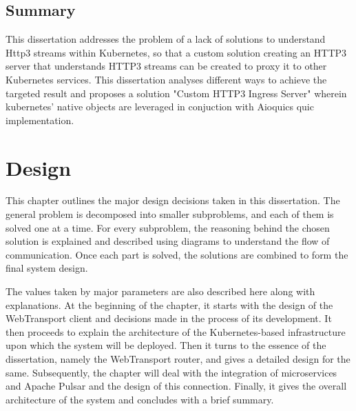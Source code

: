 \section{Summary}
This dissertation addresses the problem of a lack of solutions to understand Http3 streams within Kubernetes, so that a custom solution creating an HTTP3 server that understands HTTP3 streams can be created to proxy it to other Kubernetes services. This dissertation analyses different ways to achieve the targeted result and proposes a solution "Custom HTTP3 Ingress Server" wherein kubernetes' native objects are leveraged in conjuction with Aioquics quic implementation.


\chapter{Design}
\label{chap:Design}




This chapter outlines the major design decisions taken in this dissertation. The general problem is decomposed into smaller subproblems, and each of them is solved one at a time. For every subproblem, the reasoning behind the chosen solution is explained and described using diagrams to understand the flow of communication. Once each part is solved, the solutions are combined to form the final system design.

The values taken by major parameters are also described here along with explanations. At the beginning of the chapter, it starts with the design of the WebTransport client and decisions made in the process of its development. It then proceeds to explain the architecture of the Kubernetes-based infrastructure upon which the system will be deployed. Then it turns to the essence of the dissertation, namely the WebTransport router, and gives a detailed design for the same. Subsequently, the chapter will deal with the integration of microservices and Apache Pulsar and the design of this connection. Finally, it gives the overall architecture of the system and concludes with a brief summary.



